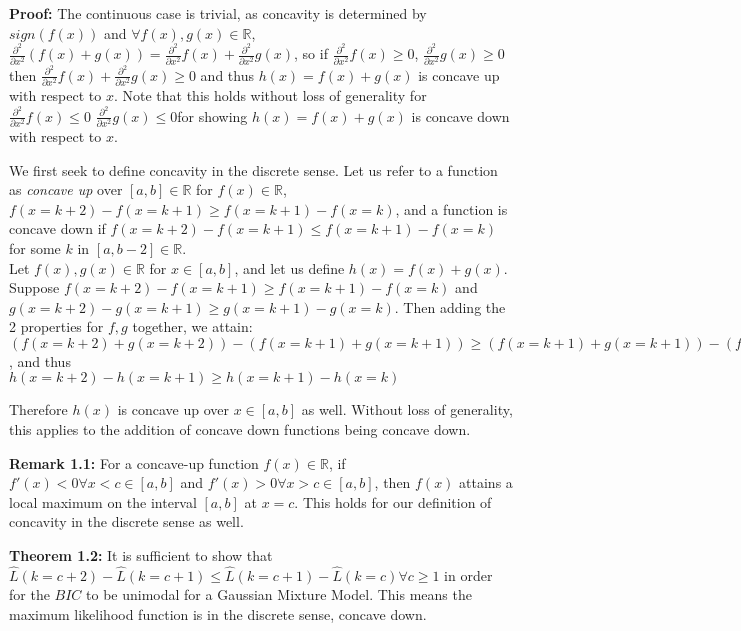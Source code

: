 \documentclass{article}
\begin{document}
 \textbf{Proof:} The continuous case is trivial, as concavity is determined by \(sign(f(x))\) and \(\forall f(x), g(x) \in \mathbb{R}\), \(\frac{\partial^2}{\partial x^2} (f(x) + g(x)) = \frac{\partial^2}{\partial x^2}f(x) + \frac{\partial^2}{\partial x^2}g(x)\), so if \(\frac{\partial^2}{\partial x^2}f(x) \geq 0\), \(\frac{\partial^2}{\partial x^2} g(x) \geq 0\) then \(\frac{\partial^2}{\partial x^2}f(x) + \frac{\partial^2}{\partial x^2}g(x) \geq 0\) and thus \(h(x) = f(x) + g(x)\)  is concave up with respect to \(x\). Note that this holds without loss of generality for \(\frac{\partial^2}{\partial x^2}f(x) \leq 0\) \(\frac{\partial^2}{\partial x^2}g(x) \leq 0\)for showing  \(h(x) = f(x) + g(x)\) is concave down with respect to $x$. 
 
 We first seek to define concavity in the discrete sense. Let us refer to a function as \textit{concave up} over \([a, b] \in \mathbb{R}\)  for \(f(x) \in \mathbb{R}\), \(f(x = k+2) - f(x = k +1) \geq f(x = k +1) - f(x = k)\), and a function is concave down if  \(f(x = k+2) - f(x = k +1) \leq f(x = k +1) - f(x = k)\) for some \(k \) in \([a, b-2] \in \mathbb{R}\). \\ 
 
 Let \(f(x), g(x) \in \mathbb{R}\) for \(x \in [a, b]\), and let us define  \(h(x) = f(x) + g(x)\). Suppose \(f(x = k+2) - f(x = k +1) \geq f(x = k +1) - f(x = k)\) and \(g(x = k+2) - g(x = k +1) \geq g(x = k +1) - g(x = k)\). Then adding the 2 properties for \(f, g\) together, we attain:\\ 
 
 \((f(x = k+2) + g(x = k+2))- (f(x = k +1) + g(x = k+1)) \geq (f(x = k +1) + g(x = k+1)) - (f(x = k) + g(x = k))\) , and thus\\ 
 
 \(h(x = k+2) - h(x = k +1) \geq h(x = k +1) - h(x = k)\)
 
 Therefore \(h(x)\) is concave up over \(x \in [a, b]\) as well. Without loss of generality, this applies to the addition of concave down functions being concave down.
 
 \textbf{Remark 1.1:} For a concave-up function \(f(x) \in \mathbb{R}\), if \(f'(x) < 0 \forall x < c \in [a,b]\) and   \(f'(x) > 0 \forall x > c \in [a,b]\), then \(f(x)\) attains a local maximum on the interval \([a,b]\) at \(x = c\). This holds for our definition of concavity in the discrete sense as well.
 
 \textbf{Theorem 1.2:} It is sufficient to show that \(\hat{L}(k = c+2) - \hat{L}(k = c +1) \leq \hat{L}(k = c+1) - \hat{L}(k = c) \forall c \geq 1\) in order for the \(BIC\) to be unimodal for a Gaussian Mixture Model. This means the maximum likelihood function is in the discrete sense, concave down. \\
\end{document}
